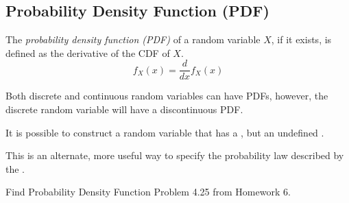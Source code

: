 	\subsection{Probability Density Function (PDF)} \label{subsec:Probability Density Function}
		\begin{definition} \label{def:Probability Density Function}
			The \emph{probability density function (PDF)} of a random variable $X$, if it exists, is defined as the derivative of the CDF of $X$.
			\begin{equation} \label{eq:Probability Density Function}
				f_{X} \left( x \right) = \frac{d}{dx} f_{X} \left( x \right)
			\end{equation}
			\begin{remark} \label{rmk:Probability Density Function}
				Both discrete and continuous random variables can have PDFs, however, the discrete random variable will have a discontinuous PDF.
			\end{remark}
			\begin{remark} \label{rmk:Probability Density Function Construction}
				It is possible to construct a random variable that has a , but an undefined .
			\end{remark}
			\begin{remark}
				This is an alternate, more useful way to specify the probability law described by the .
			\end{remark}
		\end{definition}
		\begin{example}[Problem 4.25]{Find Probability Density Function}
			Problem 4.25 from Homework 6.
		\end{example}
	
